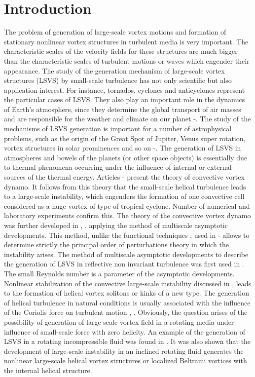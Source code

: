 \documentclass [12pt]{article}
\begin{document}
\section{Introduction}
The problem of generation of large-scale vortex motions and formation of stationary nonlinear vortex structures in turbulent media is very important.  The characteristic scales of the velocity fields for these structures are much bigger than the characteristic scales of turbulent motions or waves which engender their appearance. The study of the generation mechanism of large-scale vortex structures (LSVS) by small-scale turbulence has not only scientific but also application interest. For instance, tornados, cyclones and anticyclones represent the particular cases of LSVS. They also play an important role in the dynamics of Earth's atmosphere, since they determine the global transport of air masses and are responsible for the weather and climate on our planet \cite{1s}-\cite{3s}. The study of the mechanisms of  LSVS generation is important for a number of astrophysical problems,  such as the origin of the Great Spot of Jupiter, Venus super rotation, vortex structures in solar prominences and so on \cite{4s}-\cite{8s}. The generation of LSVS in atmospheres and bowels of the planets (or other space objects) is essentially due to thermal phenomena occurring under the influence of internal or external sources of the thermal energy. Articles \cite{9s}-\cite{11s} present the theory of convective vortex dynamo. It follows from this theory that the small-scale helical turbulence leads to a large-scale instability, which engenders the formation of one convective cell   considered as a huge vortex of type of tropical cyclone. Number of numerical \cite{12s} and laboratory \cite{13s} experiments confirm this.  The theory of the convective vortex dynamo was further developed in \cite{14s}, \cite{15s}, applying the method of multiscale asymptotic developments. This method, unlike the functional techniques \cite{16s}, \cite{17s} used in \cite{9s}-\cite{11s} allows to determine strictly the principal order of perturbations theory in which the instability arises. The method of multiscale asymptotic developments to describe the generation of LSVS in reflective non invariant turbulence was first used in \cite{18s}. The small Reynolds number is a parameter of the asymptotic developments. Nonlinear stabilization of the convective large-scale instability discussed in \cite{14s},\cite{15s} leads to the formation of helical vortex solitons or kinks of a new type. The generation of helical turbulence in natural conditions is usually associated with the influence of the Coriolis force on turbulent motion \cite{19s}, \cite{20s}. Obviously, the question arises of the possibility of generation of large-scale vortex field in a rotating media under influence of small-scale force with zero helicity. An example of the generation of LSVS in a rotating incompressible fluid was found in \cite{21s}. It was also shown that the development of large-scale instability in an inclined rotating fluid generates the nonlinear large-scale helical vortex structures or localized Beltrami vortices with the internal helical structure.
\end{document}
